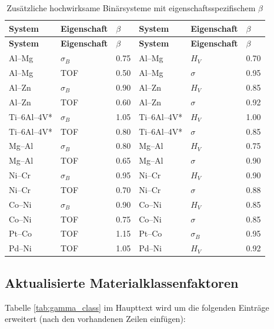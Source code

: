 \documentclass[12pt,a4paper]{article}
\begin{document}
	\begin{longtable}{p{2.2cm} p{2.2cm} p{1.2cm} p{2.2cm} p{2.2cm} p{1.2cm}}
		\caption{Zusätzliche hochwirksame Binärsysteme mit eigenschaftsspezifischem $\beta$}\label{tab:beta_additional}\\
		\toprule
		\textbf{System} & \textbf{Eigenschaft} & $\beta$ & \textbf{System} & \textbf{Eigenschaft} & $\beta$ \\
		\midrule
		\endfirsthead
		\toprule
		\textbf{System} & \textbf{Eigenschaft} & $\beta$ & \textbf{System} & \textbf{Eigenschaft} & $\beta$ \\
		\midrule
		\endhead
		Al–Mg & $\sigma_B$ & 0.75 & Al–Mg & $H_V$ & 0.70 \\
		Al–Mg & TOF & 0.50 & Al–Mg & $\sigma$ & 0.95 \\
		Al–Zn & $\sigma_B$ & 0.90 & Al–Zn & $H_V$ & 0.85 \\
		Al–Zn & TOF & 0.60 & Al–Zn & $\sigma$ & 0.92 \\
		Ti–6Al–4V* & $\sigma_B$ & 1.05 & Ti–6Al–4V* & $H_V$ & 1.00 \\
		Ti–6Al–4V* & TOF & 0.80 & Ti–6Al–4V* & $\sigma$ & 0.85 \\
		Mg–Al & $\sigma_B$ & 0.80 & Mg–Al & $H_V$ & 0.75 \\
		Mg–Al & TOF & 0.65 & Mg–Al & $\sigma$ & 0.90 \\
		Ni–Cr & $\sigma_B$ & 0.95 & Ni–Cr & $H_V$ & 0.90 \\
		Ni–Cr & TOF & 0.70 & Ni–Cr & $\sigma$ & 0.88 \\
		Co–Ni & $\sigma_B$ & 0.90 & Co–Ni & $H_V$ & 0.85 \\
		Co–Ni & TOF & 0.75 & Co–Ni & $\sigma$ & 0.85 \\
		Pt–Co & TOF & 1.15 & Pt–Co & $\sigma_B$ & 0.95 \\
		Pd–Ni & TOF & 1.05 & Pd–Ni & $H_V$ & 0.92 \\
		\bottomrule
	\end{longtable}
	\vspace{0.2cm}
	
	\subsection*{Aktualisierte Materialklassenfaktoren}
	Tabelle \ref{tab:gamma_class} im Haupttext wird um die folgenden Einträge erweitert (nach den vorhandenen Zeilen einfügen):
	
\end{document}
